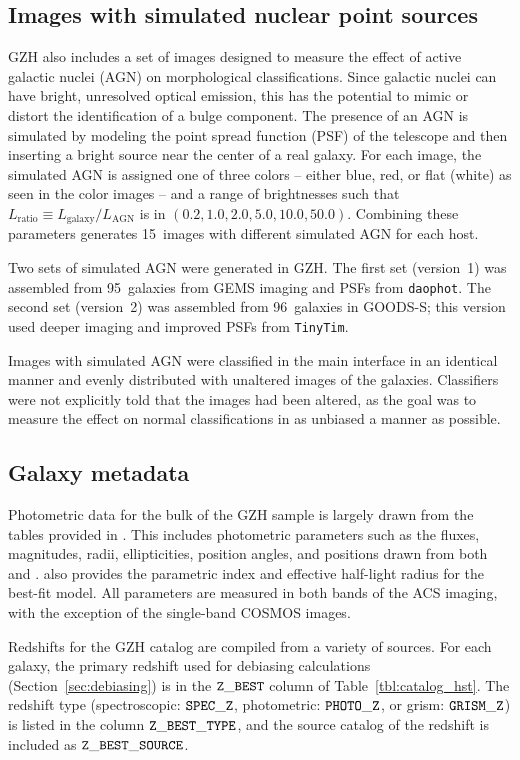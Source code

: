 \documentclass[twocolumn]{aastex6}
\begin{document}
\subsection{Images with simulated nuclear point sources}

GZH also includes a set of images designed to measure the effect of active galactic nuclei (AGN) on morphological classifications. Since galactic nuclei can have bright, unresolved optical emission, this has the potential to mimic or distort the identification of a bulge component. The presence of an AGN is simulated by modeling the point spread function (PSF) of the telescope and then inserting a bright source near the center of a real galaxy. For each image, the simulated AGN is assigned one of three colors -- either blue, red, or flat (white) as seen in the color images -- and a range of brightnesses such that $L_\mathrm{ratio} \equiv L_\mathrm{galaxy}/L_\mathrm{AGN}$ is in $(0.2,1.0,2.0,5.0,10.0,50.0)$. Combining these parameters generates 15~images with different simulated AGN for each host. 

Two sets of simulated AGN were generated in GZH. The first set (version~1) was assembled from 95~galaxies from GEMS imaging and PSFs from \texttt{daophot}. The second set (version~2) was assembled from 96~galaxies in GOODS-S; this version used deeper imaging and improved PSFs from \texttt{TinyTim}. 

Images with simulated AGN were classified in the main interface in an identical manner and evenly distributed with unaltered images of the galaxies. Classifiers were not explicitly told that the images had been altered, as the goal was to measure the effect on normal classifications in as unbiased a manner as possible. 

\subsection{Galaxy metadata}

Photometric data for the bulk of the GZH sample is largely drawn from the tables provided in \citet{gri12}. This includes photometric parameters such as the fluxes, magnitudes, radii, ellipticities, position angles, and positions drawn from both \sextractor{} and \galfit. \galfit{} also provides the parametric \sersic{} index and effective half-light radius for the best-fit model. All parameters are measured in both bands of the ACS imaging, with the exception of the single-band COSMOS images.

Redshifts for the GZH catalog are compiled from a variety of sources. For each galaxy, the primary redshift used for debiasing calculations (Section~\ref{sec:debiasing}) is in the $\tt Z\_BEST$ column of Table~\ref{tbl:catalog_hst}. The redshift type (spectroscopic: $\tt SPEC\_Z$, photometric: $\tt PHOTO\_Z$, or grism: $ \tt GRISM\_Z$) is listed in the column $\tt Z\_BEST\_TYPE$, and the source catalog of the redshift is included as $\tt Z\_BEST\_SOURCE$. 
\end{document}
